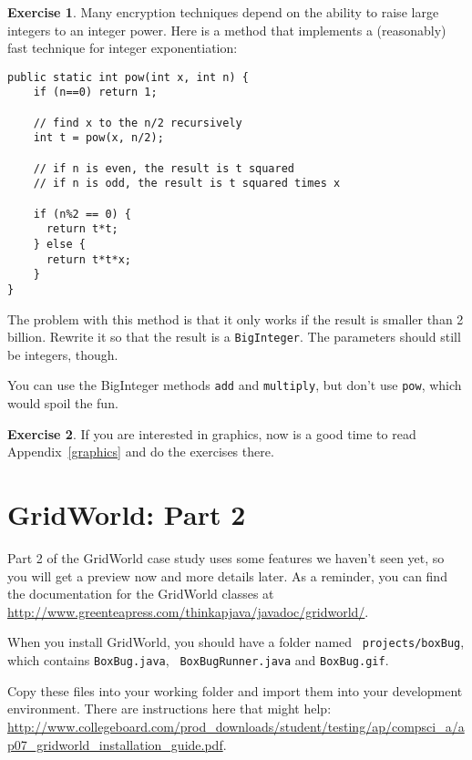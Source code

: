\documentclass[12pt]{book}
\theoremstyle{definition}
\newtheorem{excz}{Exercise}[chapter]
\newenvironment{exercise}{\bigskip\begin{excz}\mbox{}}{\end{excz}}
\begin{document}
\begin{exercise}
Many encryption techniques depend on the
ability to raise large integers to an integer power.  Here is a
method that implements a (reasonably) fast technique for integer
exponentiation:

\begin{lstlisting}
public static int pow(int x, int n) {
    if (n==0) return 1;

    // find x to the n/2 recursively
    int t = pow(x, n/2);

    // if n is even, the result is t squared
    // if n is odd, the result is t squared times x

    if (n%2 == 0) {
      return t*t;
    } else {
      return t*t*x;
    }
}
\end{lstlisting}

The problem with this method is that it only works if the result
is smaller than 2 billion.  Rewrite it so that the result is
a {\tt BigInteger}.  The parameters should still be integers, though.

You can use the BigInteger methods {\tt add} and {\tt multiply}, but
don't use {\tt pow}, which would spoil the fun.
\end{exercise}


\begin{exercise}
If you are interested in graphics, now is a good time to read
Appendix~\ref{graphics} and do the exercises there.
\end{exercise}


\chapter{GridWorld: Part 2}
\label{gridworld2}

Part 2 of the GridWorld case study uses some features we haven't
seen yet, so you will get a preview now and more details later.
As a reminder, you can find the
documentation for the GridWorld classes at
\url{http://www.greenteapress.com/thinkapjava/javadoc/gridworld/}.

When you install GridWorld, you should have a folder named {\tt
  projects/boxBug}, which contains {\tt BoxBug.java}, {\tt
  BoxBugRunner.java} and {\tt BoxBug.gif}.

Copy these files into your working folder and import them into
your development environment.
There are instructions here that
might help: \url{http://www.collegeboard.com/prod_downloads/student/testing/ap/compsci_a/ap07_gridworld_installation_guide.pdf}.
\end{document}
